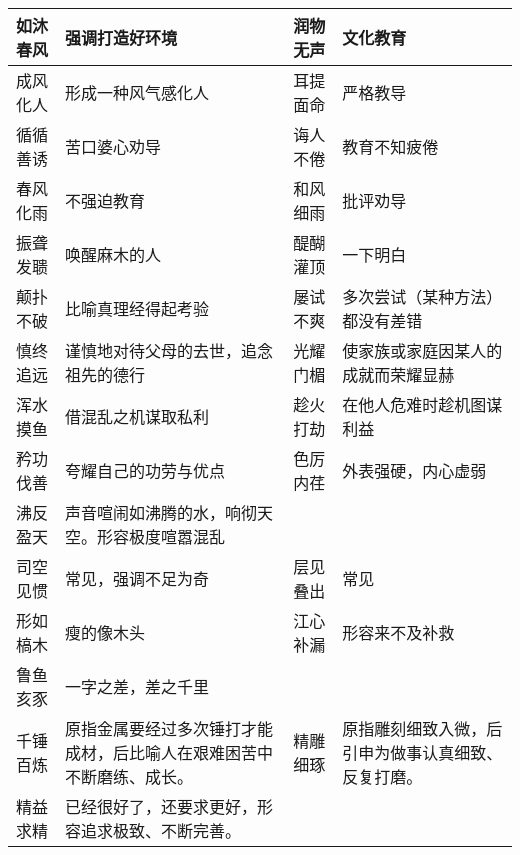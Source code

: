 \begin{longtable}{|p{}|p{}|p{}|p{}|}
    \hline
    如沐春风        & 强调打造好环境                            & 润物无声        & 文化教育                      \\
    \hline
    成风化人        & 形成一种风气感化人                          & 耳提面命        & 严格教导                      \\
    \hline
    循循善诱        & 苦口婆心劝导                             & 诲人不倦        & 教育不知疲倦                    \\
    \hline
    春风化雨        & 不强迫教育                              & 和风细雨        & 批评劝导                      \\
    \hline
    振聋发聩        & 唤醒麻木的人                             & 醍醐灌顶        & 一下明白                      \\
    \hline
    颠扑不破        & 比喻真理经得起考验                          & 屡试不爽        & 多次尝试（某种方法）都没有差错           \\
    \hline
    慎终追远        & 谨慎地对待父母的去世，追念祖先的德行                 & 光耀门楣        & 使家族或家庭因某人的成就而荣耀显赫         \\
    \hline
    浑水摸鱼        & 借混乱之机谋取私利                          & 趁火打劫        & 在他人危难时趁机图谋利益              \\
    \hline
    矜功伐善        & 夸耀自己的功劳与优点                         & 色厉内荏        & 外表强硬，内心虚弱                 \\
    \hline
    沸反盈天        & 声音喧闹如沸腾的水，响彻天空。形容极度喧嚣混乱            &             &                           \\
    \hline
    司空见惯        & 常见，强调不足为奇                          & 层见叠出        & 常见                        \\
    \hline
    形如槁木        & 瘦的像木头                              & 江心补漏        & 形容来不及补救                   \\
    \hline
    鲁鱼亥豕        & 一字之差，差之千里                          &             &                           \\
    \hline
    千锤百炼        & 原指金属要经过多次锤打才能成材，后比喻人在艰难困苦中不断磨练、成长。 & 精雕细琢        & 原指雕刻细致入微，后引申为做事认真细致、反复打磨。 \\
    \hline
    精益求精        & 已经很好了，还要求更好，形容追求极致、不断完善。           &             &                           \\
    \hline
\end{longtable}

